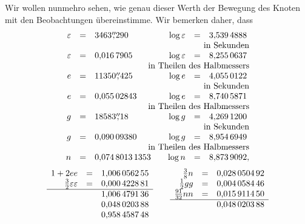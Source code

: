\clearpage
\begingroup
{}
\renewcommand{\headrulewidth}{0pt}
\par\noindent\hspace*{\parindent}Wir wollen nunmehro sehen, wie genau dieser Werth der Bewegung des
Knoten mit den Beobachtungen übereinstimme. Wir bemerken daher, dass
\begingroup\small
\setlength{\arraycolsep}{2pt}
\renewcommand{\arraystretch}{1.15}
\[
\begin{array}{rcl@{\qquad}rcl}
\varepsilon&=&3463\overset{\prime\prime}{,}290
 &\log\varepsilon&=&3{,}539\,4888\\
\multicolumn{6}{r}{\text{in Sekunden}}\\
\varepsilon&=&0{,}016\,7905
 &\log\varepsilon&=&8{,}255\,0637\\
\multicolumn{6}{r}{\text{in Theilen des Halbmessers}}\\
e&=&11350\overset{\prime\prime}{,}425
 &\log e&=&4{,}055\,0122\\
\multicolumn{6}{r}{\text{in Sekunden}}\\
e&=&0{,}055\,02843
 &\log e&=&8{,}740\,5871\\
\multicolumn{6}{r}{\text{in Theilen des Halbmessers}}\\
g&=&18583\overset{\prime\prime}{,}18
 &\log g&=&4{,}269\,1200\\
\multicolumn{6}{r}{\text{in Sekunden}}\\
g&=&0{,}090\,09380
 &\log g&=&8{,}954\,6949\\
\multicolumn{6}{r}{\text{in Theilen des Halbmessers}}\\
n&=&0{,}074\,8013\,1353
 &\log n&=&8{,}873\,9092,
\end{array}
\]
\[
\begin{array}[t]{rcl}
1+2ee&=&1{,}006\,0562\,55\\
\tfrac32\varepsilon\varepsilon&=&0{,}000\,4228\,81\\
\hline
&&1{,}006\,4791\,36\\
&&0{,}048\,0203\,88\\
&&0{,}958\,4587\,48
\end{array}
\qquad
\begin{array}[t]{rcl}
\tfrac38n&=&0{,}028\,0504\,92\\
\tfrac12gg&=&0{,}004\,0584\,46\\
\tfrac{91}{32}nn&=&0{,}015\,9114\,50\\
\hline
&&0{,}048\,0203\,88
\end{array}
\]
\endgroup
{}
\begingroup\small
